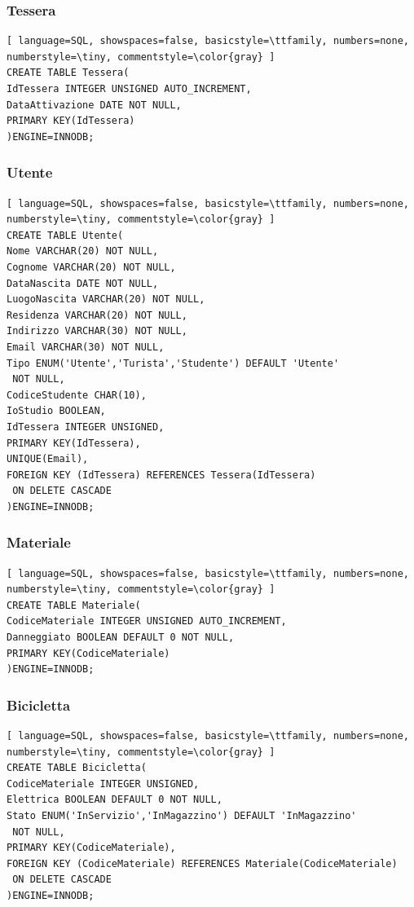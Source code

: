 \documentclass[a4paper,twoside]{article}
\begin{document}
\subsubsection{Tessera}
\begin{lstlisting}[ language=SQL, showspaces=false, basicstyle=\ttfamily, numbers=none, numberstyle=\tiny, commentstyle=\color{gray} ]
CREATE TABLE Tessera(
IdTessera INTEGER UNSIGNED AUTO_INCREMENT,
DataAttivazione DATE NOT NULL,
PRIMARY KEY(IdTessera)
)ENGINE=INNODB;
\end{lstlisting}
\subsubsection{Utente}
\begin{lstlisting}[ language=SQL, showspaces=false, basicstyle=\ttfamily, numbers=none, numberstyle=\tiny, commentstyle=\color{gray} ]
CREATE TABLE Utente(
Nome VARCHAR(20) NOT NULL,
Cognome VARCHAR(20) NOT NULL,
DataNascita DATE NOT NULL,
LuogoNascita VARCHAR(20) NOT NULL,
Residenza VARCHAR(20) NOT NULL,
Indirizzo VARCHAR(30) NOT NULL,
Email VARCHAR(30) NOT NULL,
Tipo ENUM('Utente','Turista','Studente') DEFAULT 'Utente'
 NOT NULL,
CodiceStudente CHAR(10),
IoStudio BOOLEAN,
IdTessera INTEGER UNSIGNED,
PRIMARY KEY(IdTessera),
UNIQUE(Email),
FOREIGN KEY (IdTessera) REFERENCES Tessera(IdTessera)
 ON DELETE CASCADE
)ENGINE=INNODB;
\end{lstlisting}
\subsubsection{Materiale}
\begin{lstlisting}[ language=SQL, showspaces=false, basicstyle=\ttfamily, numbers=none, numberstyle=\tiny, commentstyle=\color{gray} ]
CREATE TABLE Materiale(
CodiceMateriale INTEGER UNSIGNED AUTO_INCREMENT,
Danneggiato BOOLEAN DEFAULT 0 NOT NULL,
PRIMARY KEY(CodiceMateriale)
)ENGINE=INNODB;
\end{lstlisting}
\subsubsection{Bicicletta}
\begin{lstlisting}[ language=SQL, showspaces=false, basicstyle=\ttfamily, numbers=none, numberstyle=\tiny, commentstyle=\color{gray} ]
CREATE TABLE Bicicletta(
CodiceMateriale INTEGER UNSIGNED,
Elettrica BOOLEAN DEFAULT 0 NOT NULL,
Stato ENUM('InServizio','InMagazzino') DEFAULT 'InMagazzino'
 NOT NULL,
PRIMARY KEY(CodiceMateriale),
FOREIGN KEY (CodiceMateriale) REFERENCES Materiale(CodiceMateriale)
 ON DELETE CASCADE
)ENGINE=INNODB;
\end{lstlisting}
\end{document}
